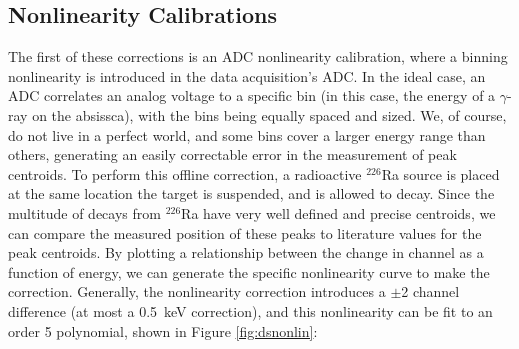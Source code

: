 \subsection{Nonlinearity Calibrations}\label{sec:nonlinearity_calibration}
The first of these corrections is an ADC nonlinearity calibration, where a binning nonlinearity is introduced in the data acquisition's ADC. In the ideal case, an ADC correlates an analog voltage to a specific bin (in this case, the energy of a $\gamma$-ray on the absissca), with the bins being equally spaced and sized. We, of course, do not live in a perfect world, and some bins cover a larger energy range than others, generating an easily correctable error in the measurement of peak centroids. To perform this offline correction, a radioactive $^{226}$Ra source is placed at the same location the target is suspended, and is allowed to decay. Since the multitude of decays from $^{226}$Ra have very well defined and precise centroids, we can compare the measured position of these peaks to literature values for the peak centroids. By plotting a relationship between the change in channel as a function of energy, we can generate the specific nonlinearity curve to make the correction. Generally, the nonlinearity correction introduces a $\pm$2 channel difference (at most a 0.5~keV correction), and this nonlinearity can be fit to an order 5 polynomial, shown in Figure \ref{fig:dsnonlin}:

